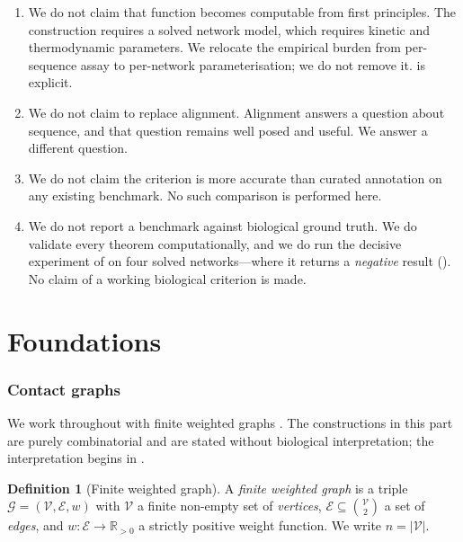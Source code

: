 \documentclass[11pt,twocolumn,a4paper]{article}
\theoremstyle{definition}
\newtheorem{definition}[theorem]{Definition}
\theoremstyle{remark}
\newcommand{\Gph}{\mathcal{G}}
\newcommand{\V}{\mathcal{V}}
\newcommand{\E}{\mathcal{E}}
\newcommand{\wt}{w}
\newcommand{\Rset}{\mathbb{R}}
\begin{document}
\begin{enumerate}[label=(\arabic*),leftmargin=2.2em]
  \item We do not claim that function becomes computable from first
  principles. The construction requires a solved network model, which
  requires kinetic and thermodynamic parameters. We relocate the
  empirical burden from per-sequence assay to per-network
  parameterisation; we do not remove it.  is explicit.
  \item We do not claim to replace alignment. Alignment answers a
  question about sequence, and that question remains well posed and
  useful. We answer a different question.
  \item We do not claim the criterion is more accurate than curated
  annotation on any existing benchmark. No such comparison is performed
  here.
  \item We do not report a benchmark against biological ground truth. We
  do validate every theorem computationally, and we do run the decisive
  experiment of  on four solved networks---where it
  returns a \emph{negative} result (). No claim
  of a working biological criterion is made.
\end{enumerate}

\part{Foundations}

\section{Contact graphs}
\label{sec:graph}

We work throughout with finite weighted graphs \citep{diestel2017}. The
constructions in this part are purely combinatorial and are stated without
biological interpretation; the interpretation begins in
.

\begin{definition}[Finite weighted graph]
\label{def:fwg}
A \emph{finite weighted graph} is a triple $\Gph=(\V,\E,\wt)$ with $\V$ a
finite non-empty set of \emph{vertices}, $\E\subseteq\binom{\V}{2}$ a set
of \emph{edges}, and $\wt:\E\to\Rset_{>0}$ a strictly positive weight
function. We write $n=|\V|$.
\end{definition}
\end{document}
